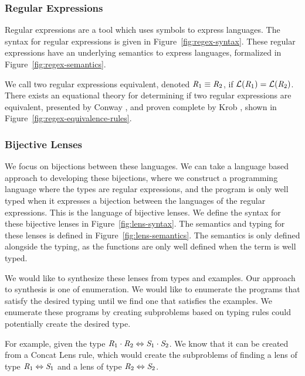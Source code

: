 \subsubsection{Regular Expressions}


Regular expressions are a tool which uses symbols to express languages.
The syntax for regular expressions is given in Figure~\ref{fig:regex-syntax}.
These regular expressions have an underlying semantics to express languages,
formalized in Figure~\ref{fig:regex-semantics}.


We call two regular expressions equivalent, denoted $\mathit{R}_1\equiv\mathit{R}_2$,
if $\mathcal{L}(\mathit{R}_1)=\mathcal{L}(\mathit{R}_2)$.
There exists an equational theory for determining if two regular expressions are equivalent,
presented by Conway \cite{conway},
and proven complete by Krob \cite{Krob},
shown in Figure~\ref{fig:regex-equivalence-rules}.

\subsubsection{Bijective Lenses}


We focus on bijections between these languages.
We can take a language based approach to developing these bijections,
where we construct a programming language where the types are regular expressions,
and the program is only well typed when it expresses a bijection between the languages
of the regular expressions.
This is the language of bijective lenses.
We define the syntax for these bijective lenses in Figure~\ref{fig:lens-syntax}.
The semantics and typing for these lenses is defined in Figure~\ref{fig:lens-semantics}.
The semantics is only defined alongside the typing, as the functions are only
well defined when the term is well typed.

We would like to synthesize these lenses from types and examples.
Our approach to synthesis is one of enumeration.
We would like to enumerate the programs that satisfy the desired typing until
we find one that satisfies the examples.
We enumerate these programs by creating subproblems based on typing rules
could potentially create the desired type.

For example, given the type $\mathit{R}_1\cdot\mathit{R}_2\Leftrightarrow\mathit{S}_1\cdot\mathit{S}_2$.
We know that it can be created from a Concat Lens rule,
which would create the subproblems of finding a lens of type $\mathit{R}_1\Leftrightarrow\mathit{S}_1$
and a lens of type $\mathit{R}_2\Leftrightarrow\mathit{S}_2$.

